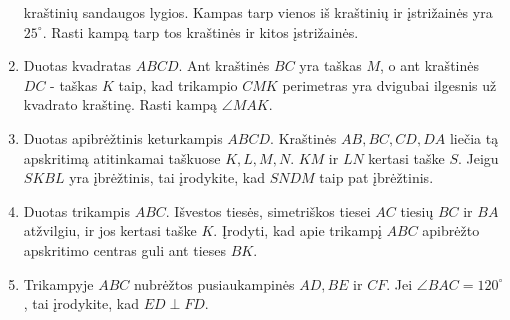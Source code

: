 \begin{enumerate}
  kraštinių sandaugos lygios. Kampas tarp vienos iš
  kraštinių ir įstrižainės yra $25^\circ$. Rasti kampą tarp
  tos kraštinės ir kitos įstrižainės.
\item Duotas kvadratas $ABCD$. Ant kraštinės $BC$ yra taškas
  $M$, o ant kraštinės $DC$ - taškas $K$ taip, kad trikampio
  $CMK$ perimetras yra dvigubai ilgesnis už kvadrato
  kraštinę. Rasti kampą $\angle MAK$.
\item Duotas apibrėžtinis keturkampis $ABCD$. Kraštinės $AB,
  BC, CD, DA$ liečia tą apskritimą atitinkamai taškuose $K,
  L, M, N$. $KM$ ir $LN$ kertasi taške $S$. Jeigu $SKBL$ yra
  įbrėžtinis, tai įrodykite, kad $SNDM$ taip pat įbrėžtinis.
\item Duotas trikampis $ABC$. Išvestos tiesės, simetriškos
  tiesei $AC$ tiesių $BC$ ir $BA$ atžvilgiu, ir jos kertasi
  taške $K$. Įrodyti, kad apie trikampį $ABC$ apibrėžto
  apskritimo centras guli ant tieses $BK$.
\item Trikampyje $ABC$ nubrėžtos pusiaukampinės $AD, BE$ ir
  $CF$. Jei $\angle BAC=120^\circ$, tai įrodykite, kad
  $ED\perp FD$.

\end{enumerate}
